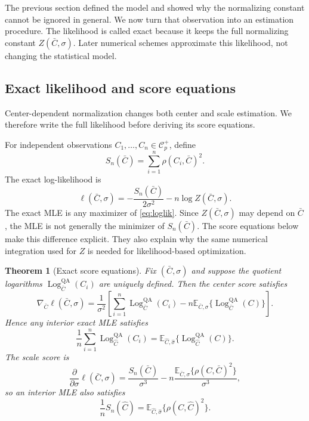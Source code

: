 \documentclass[
  12pt]{article}
\newcommand{\Corr}{\mathcal C^+}
\newcommand{\Log}{\operatorname{Log}}
\newcommand{\E}{\mathbb E}
\newcommand{\QA}{\mathrm{QA}}
\newtheorem{theorem}{Theorem}
\begin{document}
The previous section defined the model and showed why the normalizing constant cannot be ignored in general. We now turn that observation into an estimation procedure. The likelihood is called exact because it keeps the full normalizing constant $Z(\bar C,\sigma)$. Later numerical schemes approximate this likelihood, not changing the statistical model.




\subsection{Exact likelihood and score equations}

Center-dependent normalization changes both center and scale estimation. We therefore write the full likelihood before deriving its score equations.

For independent observations $C_1,\ldots,C_n\in\Corr_p$, define
\[
S_n(\bar C)=\sum_{i=1}^n \rho(C_i,\bar C)^2.
\]
The exact log-likelihood is
\begin{equation}\label{eq:loglik}
\ell(\bar C,\sigma)=-\frac{S_n(\bar C)}{2\sigma^2}-n\log Z(\bar C,\sigma).
\end{equation}
The exact MLE is any maximizer of \eqref{eq:loglik}. Since $Z(\bar C,\sigma)$ may depend on $\bar C$, the MLE is not generally the minimizer of $S_n(\bar C)$. The score equations below make this difference explicit. They also explain why the same numerical integration used for $Z$ is needed for likelihood-based optimization.


\begin{theorem}[Exact score equations]\label{thm:score}
Fix $(\bar C,\sigma)$ and suppose the quotient logarithms $\Log^{\QA}_{\bar C}(C_i)$ are uniquely defined. Then the center score satisfies
\begin{equation}\label{eq:center_score}
\nabla_{\bar C}\ell(\bar C,\sigma)=\frac{1}{\sigma^2}\left[\sum_{i=1}^n \Log^{\QA}_{\bar C}(C_i)-n\E_{\bar C,\sigma}\{\Log^{\QA}_{\bar C}(C)\}\right].
\end{equation}
Hence any interior exact MLE satisfies
\begin{equation}\label{eq:center_score_eq}
\frac1n\sum_{i=1}^n \Log^{\QA}_{\widehat C}(C_i)=\E_{\widehat C,\widehat\sigma}\{\Log^{\QA}_{\widehat C}(C)\}.
\end{equation}
The scale score is
\begin{equation}\label{eq:scale_score}
\frac{\partial}{\partial\sigma}\ell(\bar C,\sigma)=\frac{S_n(\bar C)}{\sigma^3}-n\frac{\E_{\bar C,\sigma}\{\rho(C,\bar C)^2\}}{\sigma^3},
\end{equation}
so an interior MLE also satisfies
\begin{equation}\label{eq:scale_score_eq}
\frac1nS_n(\widehat C)=\E_{\widehat C,\widehat\sigma}\{\rho(C,\widehat C)^2\}.
\end{equation}
\end{theorem}
\end{document}
